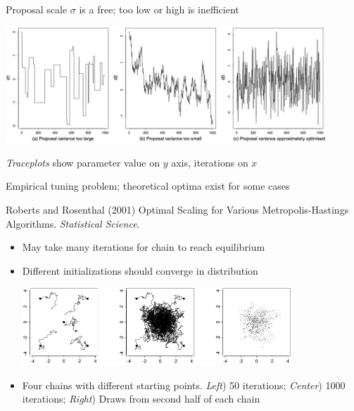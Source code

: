 \documentclass[10pt]{report}
\begin{document}
%
\begin{subitemize}
\item Proposal scale $\sigma$ is a free; too low or high is inefficient
\begin{center}
\includegraphics[width=0.9\textwidth]{img/roberts-rosenthal-traceplots.jpg}
\end{center}
\item \emph{Traceplots} show parameter value on $y$ axis, iterations on $x$
\item Empirical tuning problem; theoretical optima exist for some
  cases
\end{subitemize}
\vfill\hfill
{\tiny Roberts and Rosenthal (2001) Optimal Scaling for Various
  Metropolis-Hastings Algorithms. {\slshape Statistical Science}.}


%
\begin{itemize}
\item May take many iterations for chain to reach equilibrium
\item Different initializations should converge in distribution
\vspace*{3pt}
\begin{center}
\includegraphics[width=0.8\textwidth]{img/bda-diffuse-converge.png}
\end{center}
\item Four chains with different starting points.  \emph{Left}) 50 iterations;  \emph{Center}) 1000 iterations;  \emph{Right}) Draws from second half of each chain
\end{itemize}
\end{document}
